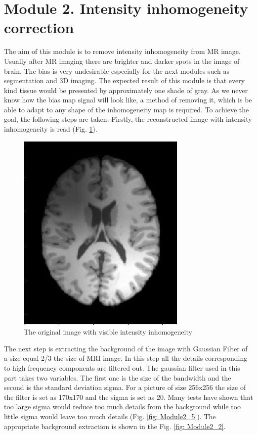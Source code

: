 \section{Module 2. Intensity inhomogeneity correction}
The aim of this module is to remove intensity inhomogeneity from MR image. Usually after MR imaging there are brighter and darker spots in the image of brain. The bias is very undesirable especially for the next modules such as segmentation and 3D imaging. The expected result of this module is that every kind tissue would be presented by approximately one shade of gray. As we never know how the bias map signal will look like, a method of removing it, which is be able to adapt to any shape of the inhomogeneity map is required. To achieve the goal, the following steps are taken. 
Firstly, the reconstructed image with intensity inhomogeneity is read (Fig. \ref{fig: Module2_1}).
\begin{figure}[H]
\centering{}\includegraphics[scale=0.7]{figures/Module_02/m2_3}\caption{The original image with visible intensity inhomogeneity} 
\label{fig: Module2_1}
\end{figure}
The next step is extracting the background of the image with Gaussian Filter of a size equal 2/3 the size of MRI image. In this step all the details corresponding to high frequency components are filtered out. The gaussian filter used in this part takes two variables. The first one is the size of the bandwidth and the second is the standard deviation sigma. For a picture of size 256x256 the size of the filter is set as 170x170 and the sigma is set as 20. Many tests have shown that too large sigma would reduce too much details from the background while too little sigma would leave too much details (Fig. \ref{fig: Module2_5}). The appropriate background extraction is shown in the Fig. \ref{fig: Module2_2}. 
